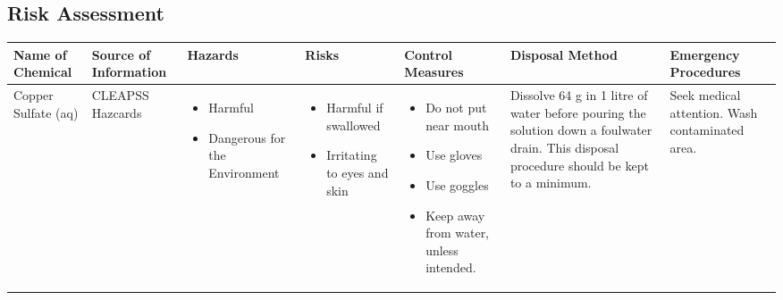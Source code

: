 






\begin{landscape}

\section{Risk Assessment}

\begin{center}
\begin{longtable}{|p{1.5cm}|p{1.5cm}|p{3cm}|p{3cm}|p{3cm}|p{3cm}|p{2cm}|}
    \hline
 \textbf{Name of Chemical} & \textbf{Source of Information} & \textbf{Hazards} & \textbf{Risks} & \textbf{Control Measures} & \textbf{Disposal Method} & \textbf{Emergency Procedures} \\ \hline

Copper Sulfate (aq) &
CLEAPSS Hazcards &
\begin{itemize}
\item Harmful
\item Dangerous for the Environment \end{itemize} &
\begin{itemize}
\item Harmful if swallowed
\item Irritating to eyes and skin \end{itemize} &
\begin{itemize}
\item Do not put near mouth
\item Use gloves
\item Use goggles
\item Keep away from water, unless intended. \end{itemize} & 
Dissolve 64 g in 1 litre of water before pouring the solution down a foulwater drain. This disposal procedure should be kept to a minimum. &
Seek medical attention. Wash contaminated area. \\ \hline


\end{longtable}
\end{center}
\end{landscape}
